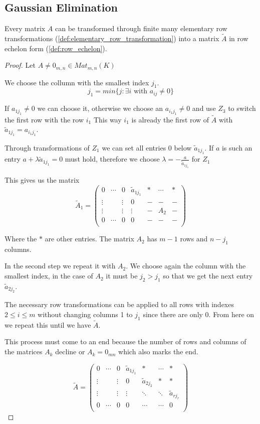 \subsection{Gaussian Elimination}
\begin{theorem}
   Every matrix \(A\) can be transformed through finite many elementary row transformations (\ref{def:elementary_row_transformation}) into a matrix \(\tilde{A}\) in row echelon form (\ref{def:row_echelon}).
\end{theorem}
\begin{proof}
Let \(A \neq 0_{m,n} \in Mat_{m,n}(K)\)

We choose the collumn with the smallest index \(j_1\).
\[j_1 = min\{j: \exists i \text{ with } a_{ij} \neq 0\}\]

If \(a_{1j_1} \neq 0\) we can choose it, otherwise we choose an \(a_{i_1j_1} \neq 0\) and use \(Z_3\) to switch the first row with the row \(i_1\)
This way \(i_1\) is already the first row of \(\tilde{A}\) with \(\tilde{a}_{1j_1} = a_{i_1j_1}\).

Through transformations of \(Z_1\) we can set all entries 0 below \(\tilde{a}_{1j_1}\).
If \(a\) is such an entry \(a + \lambda \tilde{a}_{1j_1} = 0\) must hold, therefore we choose \(\lambda = -\frac{a}{\tilde{a}_{1j_1}}\) for \(Z_1\)

This gives us the matrix
\[\tilde{A}_1 = \begin{pmatrix}
   0 & \cdots & 0 & \tilde{a}_{1j_1} & * & \cdots & * \\
   \vdots &   & \vdots & 0 & - & - & - \\
   \vdots &   & \vdots & \vdots & - & A_2 & - \\
   0 & \cdots & 0 & 0 & - & - & - \\
\end{pmatrix}\]

Where the \(*\) are other entries.
The matrix \(A_2\) has \(m - 1\) rows and \(n - j_1\) columns.

In the second step we repeat it with \(A_2\).
We choose again the column with the smallest index, in the case of \(A_2\) it must be \(j_2 > j_1\) so that we get the next entry \(\tilde{a}_{2j_2}\).

The necessary row transformations can be applied to all rows with indexes \(2 \leq i \leq m\) without changing columns 1 to \(j_1\) since there are only 0.
From here on we repeat this until we have \(\tilde{A}\).

This process must come to an end because the number of rows and columns of the matrices \(A_k\) decline or \(A_k = 0_{mn}\) which also marks the end.

\[\tilde{A} = \begin{pmatrix}
   0 & \cdots & 0 & \tilde{a}_{1j_1} & * & \cdots & * \\
   \vdots &   & \vdots & 0 & \tilde{a}_{2j_2} & * & * \\
   \vdots &   & \vdots & \vdots & \ddots & \ddots & \tilde{a}_{rj_r} \\
   0 & \cdots & 0 & 0 & \cdots & \cdots & 0 \\
\end{pmatrix}\]
\end{proof}

